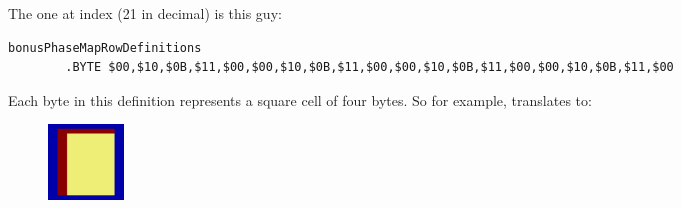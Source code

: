 The one at index  (21 in decimal) is this guy:

\begin{lstlisting}[basicstyle=\tiny]
bonusPhaseMapRowDefinitions   
        .BYTE $00,$10,$0B,$11,$00,$00,$10,$0B,$11,$00,$00,$10,$0B,$11,$00,$00,$10,$0B,$11,$00
\end{lstlisting}

Each byte in this definition represents a square cell of four bytes. So for example, 
translates to:

\begin{figure}[H]
  {
    \begin{adjustbox}{width=2cm,center}
        \includegraphics[width=2cm]{src/bonusphase/row21_cell0.png}%
    \end{adjustbox}
  }
\end{figure}

